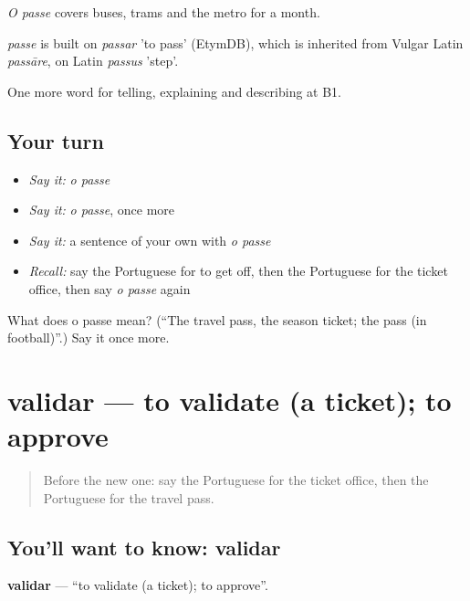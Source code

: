 \emph{O passe} covers buses, trams and the metro for a month.

\begin{cousinweb}
\emph{passe} is built on \emph{passar} 'to pass' (EtymDB), which is inherited from Vulgar Latin \emph{passāre}, on Latin \emph{passus} 'step'.
\end{cousinweb}

\begin{grammarlens}[title={What you've built}]
One more word for telling, explaining and describing at B1.
\end{grammarlens}

\subsection*{Your turn}
\begin{itemize}
\raggedright
  \item \emph{Say it:} \emph{o passe}
  \item \emph{Say it:} \emph{o passe}, once more
  \item \emph{Say it:} a sentence of your own with \emph{o passe}
  \item \emph{Recall:} say the Portuguese for to get off, then the Portuguese for the ticket office, then say \emph{o passe} again
\end{itemize}

\begin{tcolorbox}[breakable,colback=teal!4,colframe=teal!35!black,title={Before you move on}]
What does o passe mean? (\textquotedblleft{}The travel pass, the season ticket; the pass (in football)\textquotedblright{}.) Say it once more.
\end{tcolorbox}
\section[validar]{validar — to validate (a ticket); to approve}

\label{lesson:PT-C414-validar}



\begin{quote}
Before the new one: say the Portuguese for the ticket office, then the Portuguese for the travel pass.
\end{quote}

\subsection*{You'll want to know: validar}
\textbf{validar} — \textquotedblleft{}to validate (a ticket); to approve\textquotedblright{}.

